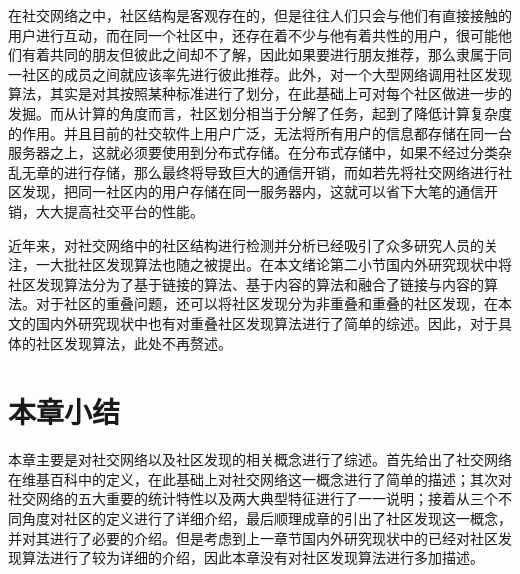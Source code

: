 在社交网络之中，社区结构是客观存在的，但是往往人们只会与他们有直接接触的用户进行互动，而在同一个社区中，还存在着不少与他有着共性的用户，很可能他们有着共同的朋友但彼此之间却不了解，因此如果要进行朋友推荐，那么隶属于同一社区的成员之间就应该率先进行彼此推荐。此外，对一个大型网络调用社区发现算法，其实是对其按照某种标准进行了划分，在此基础上可对每个社区做进一步的发掘。而从计算的角度而言，社区划分相当于分解了任务，起到了降低计算复杂度的作用。并且目前的社交软件上用户广泛，无法将所有用户的信息都存储在同一台服务器之上，这就必须要使用到分布式存储。在分布式存储中，如果不经过分类杂乱无章的进行存储，那么最终将导致巨大的通信开销，而如若先将社交网络进行社区发现，把同一社区内的用户存储在同一服务器内，这就可以省下大笔的通信开销，大大提高社交平台的性能。

近年来，对社交网络中的社区结构进行检测并分析已经吸引了众多研究人员的关注，一大批社区发现算法也随之被提出。在本文绪论第二小节国内外研究现状中将社区发现算法分为了基于链接的算法、基于内容的算法和融合了链接与内容的算法。对于社区的重叠问题，还可以将社区发现分为非重叠和重叠的社区发现，在本文的国内外研究现状中也有对重叠社区发现算法进行了简单的综述。因此，对于具体的社区发现算法，此处不再赘述。

\section{本章小结}
本章主要是对社交网络以及社区发现的相关概念进行了综述。首先给出了社交网络在维基百科中的定义，在此基础上对社交网络这一概念进行了简单的描述；其次对社交网络的五大重要的统计特性以及两大典型特征进行了一一说明；接着从三个不同角度对社区的定义进行了详细介绍，最后顺理成章的引出了社区发现这一概念，并对其进行了必要的介绍。但是考虑到上一章节国内外研究现状中的已经对社区发现算法进行了较为详细的介绍，因此本章没有对社区发现算法进行多加描述。



